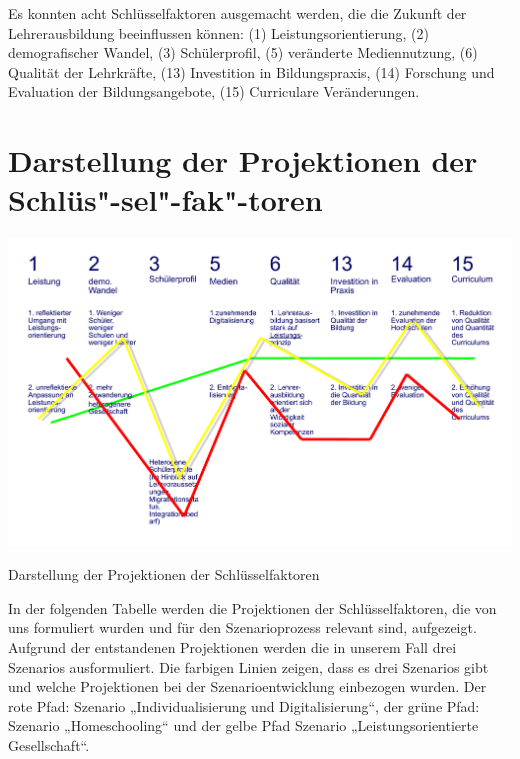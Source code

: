 \documentclass[12pt,a4paper]{article}
\begin{document}
Es konnten acht Schlüsselfaktoren ausgemacht werden, die die Zukunft der Lehrerausbildung beeinflussen können: (1) Leistungsorientierung, (2) demografischer Wandel, (3) Schülerprofil, (5) veränderte Mediennutzung, (6) Qualität der Lehrkräfte, (13) Investition in Bildungspraxis, (14) Forschung und Evaluation der Bildungsangebote, (15) Curriculare Veränderungen.

\pagebreak

\section{Darstellung der Projektionen der Schlüs"-sel"-fak"-toren} 
\begin{table}[!ht]
\begin{center}
\includegraphics[scale=0.67,angle=90]{projektionen.pdf}
\caption{Darstellung der Projektionen der Schlüsselfaktoren}
\end{center}
\label{projektionen}
\end{table}
\FloatBarrier

In der folgenden Tabelle werden die Projektionen der Schlüsselfaktoren, die von uns formuliert wurden und für den Szenarioprozess relevant sind, aufgezeigt. Aufgrund der entstandenen Projektionen werden die in unserem Fall drei Szenarios ausformuliert. Die farbigen Linien zeigen, dass es drei Szenarios gibt und welche Projektionen bei der Szenarioentwicklung einbezogen wurden. Der rote Pfad: Szenario „Individualisierung und Digitalisierung“, der grüne Pfad: Szenario „Homeschooling“ und der gelbe Pfad Szenario „Leistungsorientierte Gesellschaft“.
\end{document}
